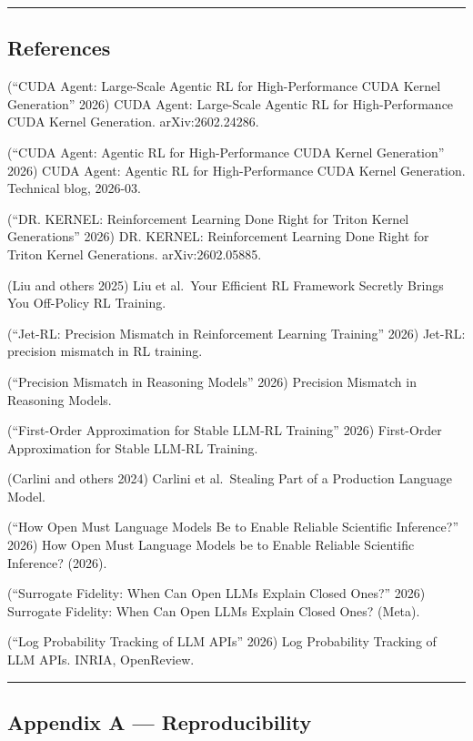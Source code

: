 \documentclass[
  11pt,
]{article}
\begin{document}
\begin{center}\rule{0.5\linewidth}{0.5pt}\end{center}

\hypertarget{references}{%
\subsection{References}\label{references}}

({``{CUDA Agent}: Large-Scale Agentic {RL} for High-Performance {CUDA}
Kernel Generation''} 2026) CUDA Agent: Large-Scale Agentic RL for
High-Performance CUDA Kernel Generation. arXiv:2602.24286.

({``{CUDA Agent}: Agentic {RL} for High-Performance {CUDA} Kernel
Generation''} 2026) CUDA Agent: Agentic RL for High-Performance CUDA
Kernel Generation. Technical blog, 2026-03.

({``{DR. KERNEL}: Reinforcement Learning Done Right for {Triton} Kernel
Generations''} 2026) DR. KERNEL: Reinforcement Learning Done Right for
Triton Kernel Generations. arXiv:2602.05885.

(Liu and others 2025) Liu et al.~Your Efficient RL Framework Secretly
Brings You Off-Policy RL Training.

({``{Jet-RL}: Precision Mismatch in Reinforcement Learning Training''}
2026) Jet-RL: precision mismatch in RL training.

({``Precision Mismatch in Reasoning Models''} 2026) Precision Mismatch
in Reasoning Models.

({``First-Order Approximation for Stable {LLM-RL} Training''} 2026)
First-Order Approximation for Stable LLM-RL Training.

(Carlini and others 2024) Carlini et al.~Stealing Part of a Production
Language Model.

({``How Open Must Language Models Be to Enable Reliable Scientific
Inference?''} 2026) How Open Must Language Models be to Enable Reliable
Scientific Inference? (2026).

({``Surrogate Fidelity: When Can Open {LLMs} Explain Closed Ones?''}
2026) Surrogate Fidelity: When Can Open LLMs Explain Closed Ones?
(Meta).

({``Log Probability Tracking of {LLM} {APIs}''} 2026) Log Probability
Tracking of LLM APIs. INRIA, OpenReview.

\begin{center}\rule{0.5\linewidth}{0.5pt}\end{center}

\hypertarget{appendix-a-reproducibility}{%
\subsection{Appendix A ---
Reproducibility}\label{appendix-a-reproducibility}}
\end{document}
